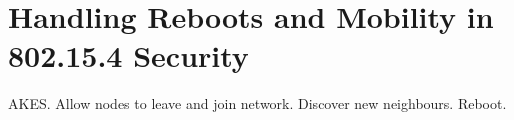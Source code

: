 \chapter{Handling Reboots and Mobility in 802.15.4 Security}
\label{chp:krentz-mobility}

AKES. Allow nodes to leave and join network. Discover new neighbours. Reboot.